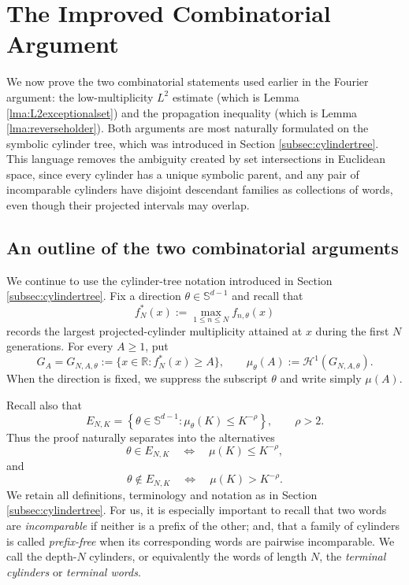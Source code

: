 \documentclass[12pt]{amsart}
\numberwithin{equation}{section}
\begin{document}
\section{The Improved Combinatorial Argument}\label{sec:comblemmata}
\raggedbottom

We now prove the two combinatorial statements used earlier in the Fourier argument: the low-multiplicity $L^2$ estimate (which is Lemma \ref{lma:L2exceptionalset}) and the propagation inequality (which is Lemma \ref{lma:reverseholder}).  Both arguments are most naturally formulated on the symbolic cylinder tree, which was introduced in Section \ref{subsec:cylindertree}.  This language removes the ambiguity created by set intersections in Euclidean space, since every cylinder has a unique symbolic parent, and any pair of incomparable cylinders have disjoint descendant families as collections of words, even though their projected intervals may overlap.

\subsection{An outline of the two combinatorial arguments}\label{subsec:combinatorialoutline} We continue to use the cylinder-tree notation introduced in Section
\ref{subsec:cylindertree}.  Fix a direction $\theta\in\mathbb S^{d-1}$ and
recall that
\[
    f_N^*(x):=\max_{1\leq n\leq N}f_{n,\theta}(x)
\]
records the largest projected-cylinder multiplicity attained at $x$ during
the first $N$ generations.  For every $A\geq1$, put
\[
    G_A=G_{N,A,\theta}
    :=\{x\in\mathbb R:f_N^*(x)\geq A\},
    \qquad
    \mu_\theta(A):=\mathcal H^1(G_{N,A,\theta}).
\]
When the direction is fixed, we suppress the subscript $\theta$ and write
simply $\mu(A)$.

Recall also that
\[
    E_{N,K}
    =
    \left\{
    \theta\in\mathbb S^{d-1}:
    \mu_\theta(K)\leq K^{-\rho}
    \right\},
    \qquad \rho>2.
\]
Thus the proof naturally separates into the alternatives
\[
    \theta\in E_{N,K}
    \quad\Longleftrightarrow\quad
    \mu(K)\leq K^{-\rho},
\]
and
\[
    \theta\notin E_{N,K}
    \quad\Longleftrightarrow\quad
    \mu(K)>K^{-\rho}.
\]
We retain all definitions, terminology and notation as in Section \ref{subsec:cylindertree}. For us, it is especially important to recall that two words are \textit{incomparable} if neither is a prefix of the other; and, that a family of cylinders is called
\textit{prefix-free} when its corresponding words are pairwise incomparable.  We call the depth-$N$ cylinders, or equivalently the
words of length $N$, the \textit{terminal cylinders} or \textit{terminal
words}.
\end{document}
